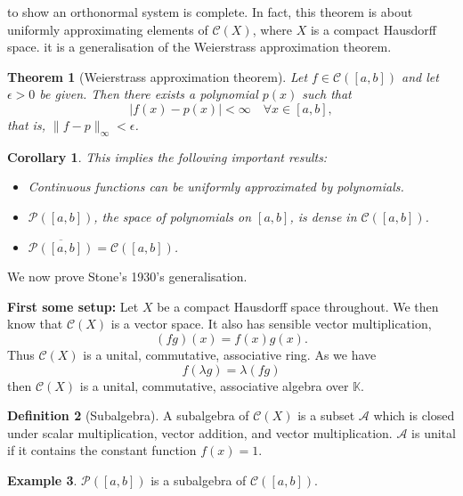 \documentclass[justified]{tufte-book}
\theoremstyle{plain}%
\newtheorem{thm}{Theorem}[chapter]
\newtheorem*{cor}{Corollary}
\theoremstyle{definition}
\newtheorem{defn}[thm]{Definition}
\newtheorem{exmp}[thm]{Example}
\theoremstyle{remark}
\newcommand{\K}{\mathbb{K}}
\begin{document}
 to show an orthonormal system is complete.  In fact, this theorem is about uniformly approximating elements of $\mathcal{C}(X)$, where $X$ is a compact Hausdorff space.  it is a generalisation of the Weierstrass approximation theorem.

\begin{thm}[Weierstrass approximation theorem]
  Let $f \in \mathcal{C}([a,b])$ and let $\epsilon > 0$ be given.  Then there exists a polynomial $p(x)$ such that \[
      |f(x) - p(x) | < \infty \quad \forall x \in [a,b],
  \] that is, $\| f - p \|_\infty < \epsilon$.
  
  
\end{thm}
\begin{cor}  This implies the following important results:
  \begin{itemize}
      \item Continuous functions can be uniformly approximated by polynomials.  
      \item $\mathcal{P}([a,b])$, the space of polynomials on $[a,b]$, is dense in $\mathcal{C}([a,b])$.
      \item $\overline{\mathcal{P}([a,b])} = \mathcal{C}([a,b])$.   
  \end{itemize}
\end{cor}

We now prove Stone's 1930's generalisation.

\textbf{First some setup:} Let $X$ be a compact Hausdorff space throughout.  We then know that $\mathcal{C}(X)$ is a vector space.  It also has sensible vector multiplication, \[
  (fg)(x) = f(x) g(x).
\] Thus $\mathcal{C}(X)$ is a unital, commutative, associative ring.  As we have \[
  f(\lambda g) = \lambda (fg)
\] then $\mathcal{C}(X)$ is a unital, commutative, associative algebra over $\K$.  

\begin{defn}[Subalgebra] A subalgebra of $\mathcal{C}(X)$ is a subset $\mathcal{A}$ which is closed under scalar multiplication, vector addition, and vector multiplication.  $\mathcal{A}$ is unital if it contains the constant function $f(x) = 1$.  
\end{defn}

\begin{exmp}
  $\mathcal{P}([a,b])$ is a subalgebra of $\mathcal{C}([a,b])$.  
\end{exmp}
\end{document}
